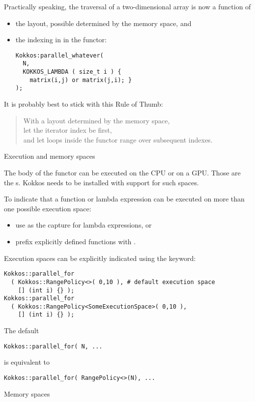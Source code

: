 Practically speaking, the traversal of a two-dimensional array is now a function of 
\begin{itemize}
\item the layout, possible determined by the memory space, and
\item the indexing in in the functor:
\begin{lstlisting}
Kokkos:parallel_whatever(
  N,
  KOKKOS_LAMBDA ( size_t i ) {
    matrix(i,j) or matrix(j,i); }
);
\end{lstlisting}
\end{itemize}
It is probably best to stick with this Rule of Thumb:
\begin{quotation}
  With a layout determined by the memory space,\\
  let the iterator index be first,\\
  and let loops inside the functor range over subsequent indexes.
\end{quotation}

 {Execution and memory spaces}

The body of the functor can be executed on the CPU or on a GPU.
Those are the s.
Kokkos needs to be installed with support for such spaces.

To indicate that a function or lambda expression can be executed
on more than one possible execution space:
\begin{itemize}
\item use  as the capture for lambda expressions, or
\item prefix explicitly defined functions with .
\end{itemize}
Execution spaces can be explicitly indicated using the 
keyword:
\begin{lstlisting}
Kokkos::parallel_for
  ( Kokkos::RangePolicy<>( 0,10 ), # default execution space
    [] (int i) {} );
Kokkos::parallel_for
  ( Kokkos::RangePolicy<SomeExecutionSpace>( 0,10 ), 
    [] (int i) {} );
\end{lstlisting}
The default
\begin{lstlisting}
Kokkos::parallel_for( N, ...
\end{lstlisting}
is equivalent to 
\begin{lstlisting}
Kokkos::parallel_for( RangePolicy<>(N), ...
\end{lstlisting}

 {Memory spaces}

